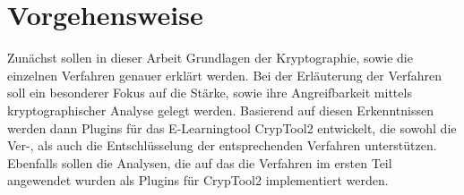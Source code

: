 \documentclass[fontsize=11pt, paper=a4, parskip=half]{scrartcl}
\begin{document}
\section{Vorgehensweise}
Zunächst sollen in dieser Arbeit Grundlagen der Kryptographie, sowie die einzelnen Verfahren genauer erklärt werden. Bei der Erläuterung der Verfahren soll ein besonderer Fokus auf die Stärke, sowie ihre Angreifbarkeit mittels kryptographischer Analyse gelegt werden. Basierend auf diesen Erkenntnissen werden dann Plugins für das E-Learningtool CrypTool2 entwickelt, die sowohl die Ver-, als auch die Entschlüsselung der entsprechenden Verfahren unterstützen. Ebenfalls sollen die Analysen, die auf das die Verfahren im ersten Teil angewendet wurden als Plugins für CrypTool2 implementiert werden. 

\pagebreak


\nocite{*}

\end{document}
